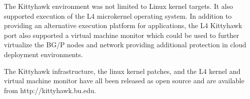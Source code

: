 The Kittyhawk environment was not limited to Linux kernel targets.  
It also supported execution of the L4 microkernel operating system.  
In addition to providing an alternative execution platform for applications,
the L4 Kittyhawk port also supported a virtual machine monitor which could
be used to further virtualize the BG/P nodes and network providing additional
protection in cloud deployment environments.

The Kittyhawk infrastructure, the linux kernel patches, and the L4 kernel
and virtual machine monitor have all been released as open source and are
available from http://kittyhawk.bu.edu.
